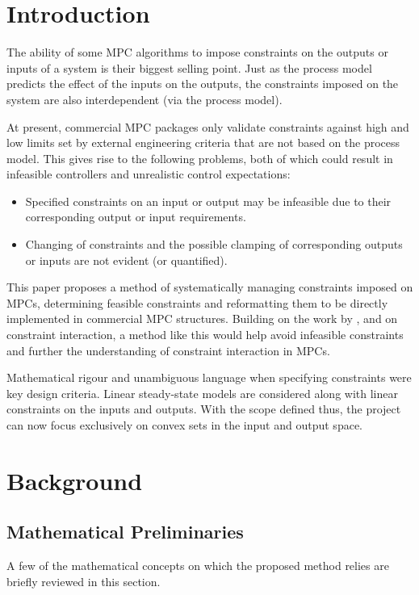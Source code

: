 \documentclass[final,authoryear,5pt,times,twocolumn]{elsarticle}
\begin{document}


\section{Introduction}\label{sec:intro}
The ability of some MPC algorithms to impose constraints on the outputs or inputs of a system is their biggest selling point.
Just as the process model predicts the effect of the inputs on the outputs, the constraints imposed on the system are also interdependent (via the process model).

At present, commercial MPC packages only validate constraints against high and low limits set by external engineering criteria that are not based on the process model.
This gives rise to the following problems, both of which could result in infeasible controllers and unrealistic control expectations:
\begin{itemize}
  \item Specified constraints on an input or output may be infeasible due to their corresponding output or input requirements.
  \item Changing of constraints and the possible clamping of corresponding outputs or inputs are not evident (or quantified).
\end{itemize}

This paper proposes a method of systematically managing constraints imposed on MPCs, determining feasible constraints and reformatting them to be directly implemented in commercial MPC structures.
Building on the work by \citet{vinsonartoi}, \citet{opconproc} and \citet{limaphd} on constraint interaction, a method like this would help avoid infeasible constraints and further the understanding of constraint interaction in MPCs.

Mathematical rigour and unambiguous language when specifying constraints were key design criteria.
Linear steady-state models are considered along with linear constraints on the inputs and outputs.
With the scope defined thus, the project can now focus exclusively on convex sets in the input and output space.


\section{Background}\label{sec:background}
\subsection{Mathematical Preliminaries}
A few of the mathematical concepts on which the proposed method relies are briefly reviewed in this section.
\end{document}
